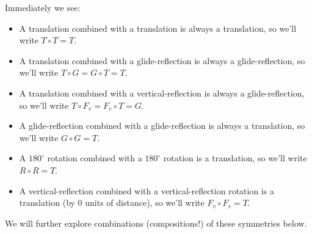 \documentclass[noauthor,nooutcomes,hints        ]{ximera}
\begin{document}
Immediately we see:
\begin{itemize}
\item A translation combined with a translation is always a
  translation, so we'll write $T\circ T = T$.
\item A translation combined with a glide-reflection is always a
  glide-reflection, so we'll write $T\circ G = G \circ T = T$.
\item A translation combined with a vertical-reflection is always a
  glide-reflection, so we'll write $T\circ F_v = F_v \circ T = G$.
\item A glide-reflection combined with a glide-reflection is always a
  translation, so we'll write $G\circ G = T$.
\item A $180^\circ$ rotation combined with a $180^\circ$ rotation is a
  translation, so we'll write $R\circ R = T$.
\item A vertical-reflection combined with a vertical-reflection
  rotation is a translation (by $0$ units of distance), so we'll write
  $F_v\circ F_v = T$.
\end{itemize}


We will further explore combinations (compositions!) of these symmetries below.













\mynewpage
\end{document}
